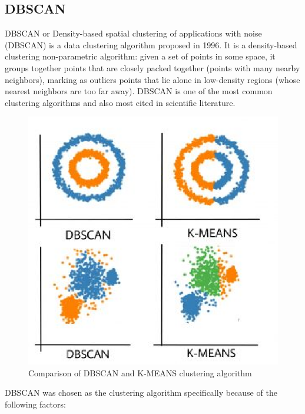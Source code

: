 \documentclass{fisatprojectfinal}
\begin{document}
\subsection{DBSCAN}
DBSCAN or Density-based spatial clustering of applications with noise (DBSCAN) is a data clustering algorithm proposed in 1996. It is a density-based clustering non-parametric algorithm: given a set of points in some space, it groups together points that are closely packed together (points with many nearby neighbors), marking as outliers points that lie alone in low-density regions (whose nearest neighbors are too far away). DBSCAN is one of the most common clustering algorithms and also most cited in scientific literature.

\begin{figure}[h!]
\begin{center}
\includegraphics[scale=.75]{img_dbscan.eps}
\caption{Comparison of DBSCAN and K-MEANS clustering algorithm}
\end{center}
\end{figure}

DBSCAN was chosen as the clustering algorithm specifically because of the following factors:
\end{document}
